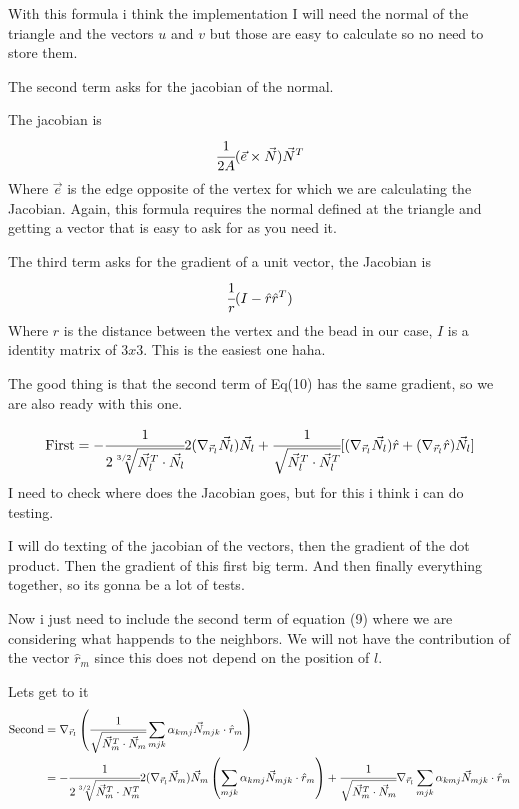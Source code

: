 \documentclass[11pt]{article}
\theoremstyle{plain}
\theoremstyle{definition}
\begin{document}
With this formula i think the implementation I will need the normal of the triangle and the vectors $u$ and $v$ but those are easy to calculate so no need to store them.

The second term asks for the jacobian of the normal.

The jacobian is 
\begin{equation}
  \cfrac{1}{2A}(\vec{e}\times \vec{N})\vec{N}^T
\end{equation}
Where $\vec{e}$ is the edge opposite of the vertex for which we are calculating the Jacobian.
Again, this formula requires the normal defined at the triangle and getting a vector that is easy to ask for as you need it. 


The third term asks for the gradient of a unit vector, the Jacobian is 
\begin{equation}
  \cfrac{1}{r}(I-\hat{r}\hat{r}^T)
\end{equation}
Where $r$ is the distance between the vertex and the bead in our case, $I$ is a identity matrix of $3x3$.
This is the easiest one haha. 



The good thing is that the second term of Eq(10) has the same gradient, so we are also ready with this one. 



\begin{align}
  \text{First}=-\cfrac{1}{2\sqrt[3/2]{\vec{N}_l^T\cdot \vec{N}_l}}2(\nabla_{\vec{r}_l}\vec{N}_l)\vec{N}_l + \cfrac{1}{\sqrt{\vec{N}_l^T\cdot \vec{N}_l^T}}[(\nabla_{\vec{r}_l} \vec{N_l})\hat{r}+(\nabla_{\vec{r}_l}\hat{r})\vec{N}_l]
\end{align}
I need to check where does the Jacobian goes, but for this i think i can do testing.

I will do texting of the jacobian of the vectors, then the gradient of the dot product. 
Then the gradient of this first big term. And then finally everything together, so its gonna be a lot of tests.








Now i just need to include the second term of equation (9) where we are considering what happends to the neighbors.
We will not have the contribution of the vector $\hat{r}_m$ since this does not depend on the position of $l$.


Lets get to it 
\begin{align}
  \text{Second}&= \nabla_{\vec{r}_l}\left( \cfrac{1}{\sqrt{\vec{N}_m^T\cdot \vec{N}_m}}    \sum_{mjk}\alpha_{kmj}\vec{N}_{mjk}\cdot \hat{r}_m\right) \\
  &=-\cfrac{1}{2\sqrt[3/2]{\vec{N}_m^T\cdot N_m^T}}2(\nabla_{\vec{r}_l} \vec{N}_m)\vec{N}_m \left( \sum_{mjk}\alpha_{kmj}\vec{N}_{mjk}\cdot \hat{r}_m \right)+\cfrac{1}{\sqrt{\vec{N}_m^T\cdot \vec{N}_m}}\nabla_{\vec{r}_l}\sum_{mjk}\alpha_{kmj}\vec{N}_{mjk}\cdot \hat{r}_m
\end{align}
\end{document}
